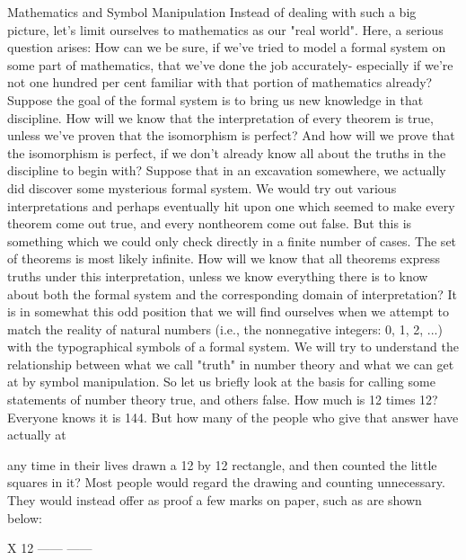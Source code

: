 Mathematics and Symbol Manipulation Instead of dealing with such a big picture, let's limit ourselves to mathematics as our "real world". Here, a serious question arises: How can we be sure, if we've tried to model a formal system on some part of mathematics, that we've done the job accurately- especially if we're not one hundred per cent familiar with that portion of mathematics already? Suppose the goal of the formal system is to bring us new knowledge in that discipline. How will we know that the interpretation of every theorem is true, unless we've proven that the isomorphism is perfect? And how will we prove that the isomorphism is perfect, if we don't already know all about the truths in the discipline to begin with? Suppose that in an excavation somewhere, we actually did discover some mysterious formal system. We would try out various interpretations and perhaps eventually hit upon one which seemed to make every theorem come out true, and every nontheorem come out false. But this is something which we could only check directly in a finite number of cases. The set of theorems is most likely infinite. How will we know that all theorems express truths under this interpretation, unless we know everything there is to know about both the formal system and the corresponding domain of interpretation? It is in somewhat this odd position that we will find ourselves when we attempt to match the reality of natural numbers (i.e., the nonnegative integers: 0, 1, 2, ...) with the typographical symbols of a formal system. We will try to understand the relationship between what we call "truth" in number theory and what we can get at by symbol manipulation. So let us briefly look at the basis for calling some statements of number theory true, and others false. How much is 12 times 12? Everyone knows it is 144. But how many of the people who give that answer have actually at 







any time in their lives drawn a 12 by 12 rectangle, and then counted the little squares in it? Most people would regard the drawing and counting unnecessary. They would instead offer as proof a few marks on paper, such as are shown below: 

X 12 ------ ------ 



